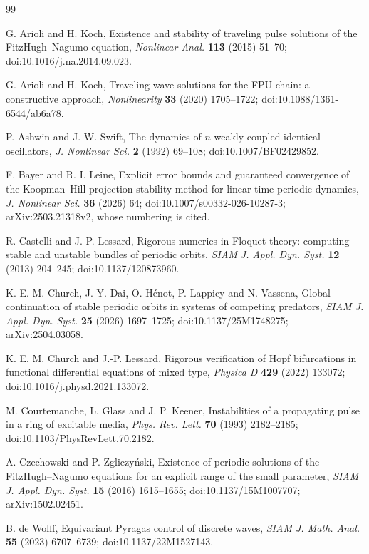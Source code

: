 \documentclass[11pt]{article}
\theoremstyle{definition}
\begin{document}
\begin{thebibliography}{99}

 G. Arioli and H. Koch, Existence and stability of traveling pulse solutions of the FitzHugh--Nagumo equation, \emph{Nonlinear Anal.} \textbf{113} (2015) 51--70; doi:10.1016/j.na.2014.09.023.

 G. Arioli and H. Koch, Traveling wave solutions for the FPU chain: a constructive approach, \emph{Nonlinearity} \textbf{33} (2020) 1705--1722; doi:10.1088/1361-6544/ab6a78.

 P. Ashwin and J. W. Swift, The dynamics of $n$ weakly coupled identical oscillators, \emph{J. Nonlinear Sci.} \textbf{2} (1992) 69--108; doi:10.1007/BF02429852.

 F. Bayer and R. I. Leine, Explicit error bounds and guaranteed convergence of the Koopman--Hill projection stability method for linear time-periodic dynamics, \emph{J. Nonlinear Sci.} \textbf{36} (2026) 64; doi:10.1007/s00332-026-10287-3; arXiv:2503.21318v2, whose numbering is cited.

 R. Castelli and J.-P. Lessard, Rigorous numerics in Floquet theory: computing stable and unstable bundles of periodic orbits, \emph{SIAM J. Appl. Dyn. Syst.} \textbf{12} (2013) 204--245; doi:10.1137/120873960.

 K. E. M. Church, J.-Y. Dai, O. H\'enot, P. Lappicy and N. Vassena, Global continuation of stable periodic orbits in systems of competing predators, \emph{SIAM J. Appl. Dyn. Syst.} \textbf{25} (2026) 1697--1725; doi:10.1137/25M1748275; arXiv:2504.03058.

 K. E. M. Church and J.-P. Lessard, Rigorous verification of Hopf bifurcations in functional differential equations of mixed type, \emph{Physica D} \textbf{429} (2022) 133072; doi:10.1016/j.physd.2021.133072.

 M. Courtemanche, L. Glass and J. P. Keener, Instabilities of a propagating pulse in a ring of excitable media, \emph{Phys. Rev. Lett.} \textbf{70} (1993) 2182--2185; doi:10.1103/PhysRevLett.70.2182.

 A. Czechowski and P. Zgliczy\'nski, Existence of periodic solutions of the FitzHugh--Nagumo equations for an explicit range of the small parameter, \emph{SIAM J. Appl. Dyn. Syst.} \textbf{15} (2016) 1615--1655; doi:10.1137/15M1007707; arXiv:1502.02451.

 B. de Wolff, Equivariant Pyragas control of discrete waves, \emph{SIAM J. Math. Anal.} \textbf{55} (2023) 6707--6739; doi:10.1137/22M1527143.


\end{thebibliography}
\end{document}
